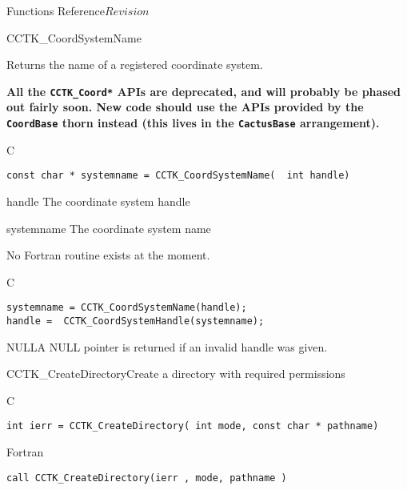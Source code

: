 \begin{cactuspart}{ Functions Reference}{}{$Revision$}

\begin{FunctionDescription}{CCTK\_CoordSystemName}%
{Returns the name of a registered coordinate system.

\textbf{All the \texttt{CCTK\_Coord*} APIs are deprecated,
and will probably be phased out fairly soon.
New code should use the APIs provided by the \texttt{CoordBase} thorn
instead (this lives in the \texttt{CactusBase} arrangement).}
}
\label{CCTK-CoordSystemName}
\begin{SynopsisSection}
\begin{Synopsis}{C}
\begin{verbatim}const char * systemname = CCTK_CoordSystemName(  int handle)\end{verbatim}
\end{Synopsis}
\end{SynopsisSection}
\begin{ParameterSection}
\begin{Parameter}{handle}
The coordinate system handle
\end{Parameter}
\begin{Parameter}{systemname}
The coordinate system name
\end{Parameter}
\end{ParameterSection}
\begin{Discussion}
No Fortran routine exists at the moment.
\end{Discussion}
\begin{ExampleSection}
\begin{Example}{C}
\begin{verbatim}
systemname = CCTK_CoordSystemName(handle);
handle =  CCTK_CoordSystemHandle(systemname);
\end{verbatim}
\end{Example}
\end{ExampleSection}
\begin{ErrorSection}
\begin{Error}{NULL}A NULL pointer is returned if an invalid handle was given.\end{Error}
\end{ErrorSection}
\end{FunctionDescription}


\begin{FunctionDescription}{CCTK\_CreateDirectory}{Create a directory with required permissions}
\label{CCTK-CreateDirectory}
\begin{SynopsisSection}
\begin{Synopsis}{C}
\begin{verbatim}int ierr = CCTK_CreateDirectory( int mode, const char * pathname)\end{verbatim}
\end{Synopsis}
\begin{Synopsis}{Fortran}
\begin{verbatim}call CCTK_CreateDirectory(ierr , mode, pathname )


\end{verbatim}
\end{Synopsis}
\end{SynopsisSection}
\end{FunctionDescription}
\end{cactuspart}
